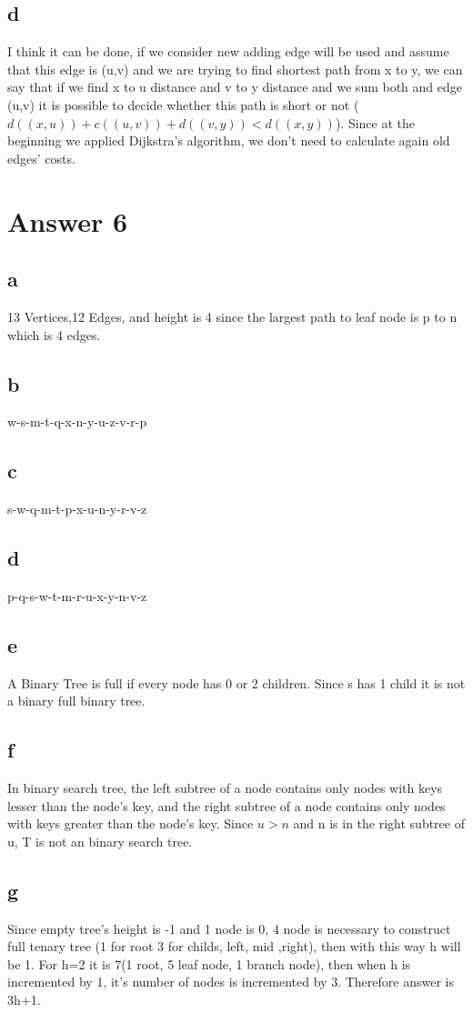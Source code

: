 \documentclass[11pt]{article}
\begin{document}
\subsection*{d}
I think it can be done, if we consider new adding edge will be used and assume that this edge is (u,v) and we are trying to find shortest path from x to y, we can say that if we find x to u distance and v to y distance and we sum both and edge (u,v) it is possible to decide whether this path is short or not ($d((x,u))+c((u,v))+d((v,y))<d((x,y))$). Since at the beginning we applied Dijkstra's algorithm, we don't need to calculate again old edges' costs.
\section*{Answer 6}
\subsection*{a}
13 Vertices,12 Edges, and height is 4 since the largest path to leaf node is p to n which is 4 edges.
\subsection*{b}
w-s-m-t-q-x-n-y-u-z-v-r-p
\subsection*{c}
s-w-q-m-t-p-x-u-n-y-r-v-z
\subsection*{d}
p-q-s-w-t-m-r-u-x-y-n-v-z
\subsection*{e}
A Binary Tree is full if every node has 0 or 2 children. Since s has 1 child it is not a binary full binary tree.
\subsection*{f}
In binary search tree, the left subtree of a node contains only nodes with keys lesser than the node’s key, and 
the right subtree of a node contains only nodes with keys greater than the node’s key. Since $u > n$ and n is in the right subtree of u, T is not an binary search tree.
\subsection*{g}
Since empty tree's height is -1 and 1 node is 0, 4 node is necessary to construct full tenary tree (1 for root 3 for childs, left, mid ,right), then with this way h will be 1. For h=2 it is 7(1 root, 5 leaf node, 1 branch node), then when h is incremented by 1, it's number of nodes is incremented by 3. Therefore answer is 3h+1.
\end{document}
